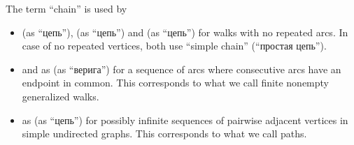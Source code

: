 \begin{remark}
\begin{thmenum}
     The term \enquote{chain} is used by
    \begin{itemize}
      \item {} (as \enquote{цепь}),  (as \enquote{цепь}) and  (as \enquote{цепь}) for walks with no repeated arcs. In case of no repeated vertices, both use \enquote{simple chain} (\enquote{простая цепь}).

      \item {} and  as (as \enquote{верига}) for a sequence of arcs where consecutive arcs have an endpoint in common. This corresponds to what we call finite nonempty generalized walks.

      \item {} as (as \enquote{цепь}) for possibly infinite sequences of pairwise adjacent vertices in simple undirected graphs. This corresponds to what we call paths.
    \end{itemize}
  \end{thmenum}
\end{remark}

